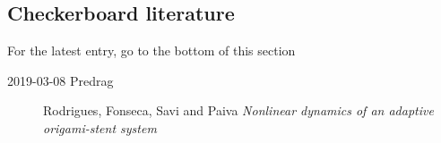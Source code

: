 \subsection{Checkerboard literature}
\label{sect:checkersLit}


\hfill   {\color{red} For the latest entry, go to the bottom of this section}

\bigskip


\begin{description}

    \item[2019-03-08 Predrag]
Rodrigues, Fonseca, Savi and Paiva
{\em Nonlinear dynamics of an adaptive origami-stent system}

\end{description}

\printbibliography[heading=subbibintoc,title={References}]

\ChapterEnd %
